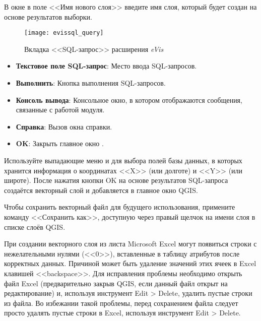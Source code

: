 В окне  в поле <<Имя нового слоя>> введите имя слоя,
который будет создан на основе результатов выборки.

\begin{figure}[ht]
   \centering
   \texttt{[image: evissql\_query]}
   \caption{Вкладка <<SQL-запрос>> расширения \emph{eVis} \wincaption}\label{evissql_query}
\end{figure}

\begin{itemize}[label=--]
\item \textbf{Текстовое поле SQL-запрос}: Место ввода SQL-запросов.
\item \textbf{Выполнить}: Кнопка выполнения SQL-запросов.
\item \textbf{Консоль вывода}: Консольное окно, в котором отображаются
сообщения, связанные с работой модуля.
\item \textbf{Справка}: Вызов окна справки.
\item \textbf{OK}: Закрыть главное окно .
\end{itemize}

Используйте выпадающие меню  и
 для выбора полей базы данных, в которых хранится
информация о координатах <<X>> (или долготе) и <<Y>> (или широте). После
нажатия кнопки OK на основе результатов SQL-запроса создаётся векторный
слой и добавляется в главное окно QGIS.

Чтобы сохранить векторный файл для будущего использования, примените
команду <<Сохранить как>>, доступную через правый щелчок на имени слоя в
списке слоёв QGIS.

\begin{Tip}\caption{\textsc{Создание векторного слоя на основе данных
листа Microsoft Excel}} При создании векторного слоя из листа Microsoft
Excel могут появиться строки с нежелательными нулями (<<0>>), вставленные
в таблицу атрибутов после корректных данных. Причиной может быть удаление
значений этих ячеек в Excel клавишей <<backspace>>. Для исправления проблемы
необходимо открыть файл Excel (предварительно закрыв QGIS, если данный файл
открыт на редактирование) и, используя инструмент Edit > Delete, удалить
пустые строки из файла. Во избежании такой проблемы, перед сохранением
файла следует просто удалять пустые строки в Excel, используя инструмент
Edit > Delete.
\end{Tip}

\label{evis_predefined}


